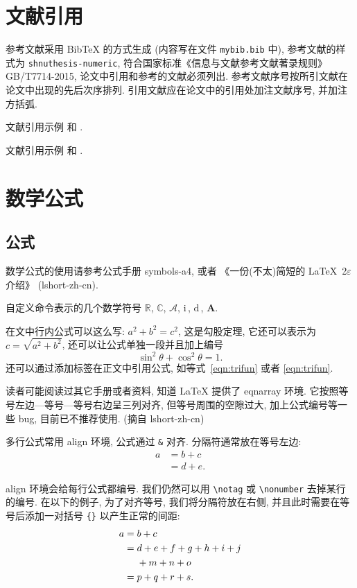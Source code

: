 \documentclass[a4paper,12pt]{article}
\theoremstyle{plain}
\newcommand{\CC}{\ensuremath{\mathbb{C}}}
\newcommand{\RR}{\ensuremath{\mathbb{R}}}
\newcommand{\A}{\mathcal{A}}
\newcommand{\ii}{\bm{\mathrm{i}}\,}  %
\newcommand{\md}{\mathrm{d}\,}
\newcommand{\bA}{\boldsymbol{A}}
\begin{document}
\section{文献引用}

参考文献采用 BibTeX 的方式生成 (内容写在文件 \verb|mybib.bib| 中), 参考文献的样式为 \verb|shnuthesis-numeric|, 符合国家标准《信息与文献参考文献著录规则》GB/T7714-2015, 论文中引用和参考的文献必须列出. 参考文献序号按所引文献在论文中出现的先后次序排列. 引用文献应在论文中的引用处加注文献序号, 并加注方括弧.

文献引用示例 \cite{Tadmor2012} 和 \cite{LiLiu1997,Adams2003,TreWei2014}.

文献引用示例 \cite{LiLiu1997} 和 \cite{Adams2003,Shen1994}.


\section{数学公式}

\subsection{公式}
数学公式的使用请参考公式手册 symbols-a4, 或者 《一份(不太)简短的 \LaTeX~2$\varepsilon$ 介绍》 (lshort-zh-cn).

自定义命令表示的几个数学符号 $\RR$, $\CC$, $\A$, $\ii$, $\md$, $\bA$.

在文中行内公式可以这么写: $a^2+b^2=c^2$, 这是勾股定理, 它还可以表示为 $c=\sqrt{a^2+b^2}$, 还可以让公式单独一段并且加上编号
\begin{equation}\label{eqn:trifun}
\sin^2{\theta}+\cos^2{\theta}=1.
\end{equation}
还可以通过添加标签在正文中引用公式, 如等式~\eqref{eqn:trifun} 或者 \ref{eqn:trifun}.

读者可能阅读过其它手册或者资料, 知道 LaTeX 提供了 eqnarray 环境. 它按照等号左边—等号—等号右边呈三列对齐, 但等号周围的空隙过大, 加上公式编号等一些 bug, 目前已不推荐使用. (摘自 lshort-zh-cn)

多行公式常用 align 环境, 公式通过 \verb|&| 对齐. 分隔符通常放在等号左边:
\begin{align}
a & = b + c \\
& = d + e.
\end{align}

align 环境会给每行公式都编号. 我们仍然可以用 \verb|\notag| 或 \verb|\nonumber| 去掉某行的编号. 在以下的例子,
为了对齐等号, 我们将分隔符放在右侧, 并且此时需要在等号后添加一对括号 \verb|{}| 以产生正常的间距:
\begin{align}
a ={} & b + c \\
={} & d + e + f + g + h + i + j \notag \\
& + m + n + o \\
={} & p + q + r + s.
\end{align}
\end{document}
